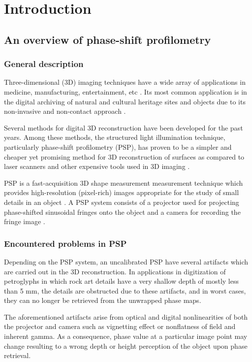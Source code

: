 \chapter{Introduction}
\section{An overview of phase-shift profilometry}
\subsection{General description}

Three-dimensional (3D) imaging techniques have a wide array of applications in medicine, manufacturing, entertainment, etc \cite{}. 
Its most common application is in the digital archiving of natural and cultural heritage sites and objects due to its non-invasive and non-contact approach \cite{Simon2013}. 

Several methods for digital 3D reconstruction have been developed for the past years. Among these methods, the structured light illumination technique, particularly phase-shift profilometry (PSP), has proven to be a simpler and cheaper yet promising method for 3D reconstruction of surfaces as compared to laser scanners and other expensive tools used in 3D imaging \cite{Zhang2002, Chrova200x}. 

PSP is a fast-acquisition 3D shape measurement measurement technique which provides high-resolution (pixel-rich) images appropriate for the study of small details in an object \cite{}. 
A PSP system consists of a projector used for projecting phase-shifted sinusoidal fringes onto the object and a camera for recording the fringe image \cite{}.

\subsection{Encountered problems in PSP}

Depending on the PSP system, an uncalibrated PSP have several artifacts which are carried out in the 3D reconstruction. 
In applications in digitization of petroglyphs in which rock art details have a very shallow depth of mostly less than 5 mm, the details are obstructed due to these artifacts, and in worst cases, they can no longer be retrieved from the unwrapped phase maps.

The aforementioned artifacts arise from optical and digital nonlinearities of both the projector and camera such as vignetting effect or nonflatness of field and inherent gamma. 
As a consequence, phase value at a particular image point may change resulting to a wrong depth or height perception of
the object upon phase retrieval.

